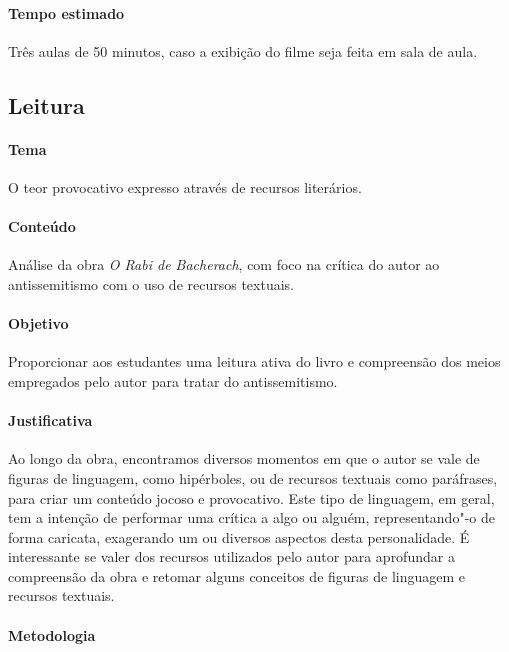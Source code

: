 \documentclass[12pt]{extarticle}
\begin{document}
\paragraph{Tempo estimado} Três aulas de 50 minutos, caso a 
exibição do filme seja feita em sala de aula.


\subsection{Leitura}

\paragraph{Tema} O teor provocativo expresso através de recursos literários.

\paragraph{Conteúdo} Análise da obra \emph{O Rabi de Bacherach}, 
com foco na crítica do autor ao antissemitismo com o uso de recursos textuais.

\paragraph{Objetivo} Proporcionar aos estudantes uma leitura ativa do livro
e compreensão dos meios empregados pelo autor para tratar do antissemitismo.

\paragraph{Justificativa} Ao longo da obra, encontramos diversos momentos em que o
autor se vale de figuras de linguagem, como hipérboles, ou de recursos
textuais como paráfrases, para criar um conteúdo jocoso e provocativo.
Este tipo de linguagem, em geral, tem a intenção de performar uma
crítica a algo ou alguém, representando"-o de forma caricata, exagerando
um ou diversos aspectos desta personalidade. É interessante se valer dos recursos
utilizados pelo autor para aprofundar a compreensão da obra e retomar alguns conceitos de figuras de linguagem e recursos textuais.

\paragraph{Metodologia}
\end{document}
